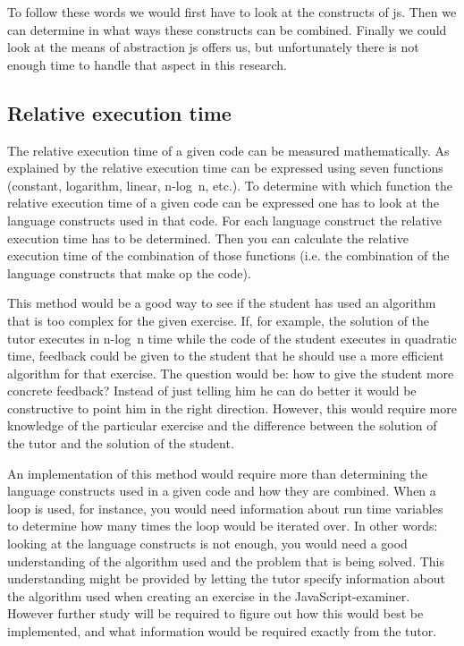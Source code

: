 To follow these words we would first have to look at
the \glspl{construct} of \gls{js}.
Then we can determine in what ways these \glspl{construct} can be combined.
Finally we could look at the means of abstraction \gls{js} offers us,
but unfortunately there is not enough time
to handle that aspect in this research.

\subsection{Relative execution time}

The relative execution time of a given code can be measured mathematically. As
explained by \citet[Chapter 4]{goodrich2008data} the relative execution time
can be expressed using seven functions (constant, logarithm, linear, n-log~n,
etc.). To determine with which function the relative execution time of a given
code can be expressed one has to look at the language constructs used in that
code. For each language construct the relative execution time has to be
determined. Then you can calculate the relative execution time of the
combination of those functions (i.e. the combination of the language constructs
that make op the code).

This method would be a good way to see if the student has used an algorithm
that is too complex for the given exercise. If, for example, the solution of
the tutor executes in n-log~n time while the code of the student executes in
quadratic time, feedback could be given to the student that he should use a
more efficient algorithm for that exercise. The question would be: how to give
the student more concrete feedback? Instead of just telling him he can do
better it would be constructive to point him in the right direction. However,
this would require more knowledge of the particular exercise and the difference
between the solution of the tutor and the solution of the student.

An implementation of this method would require more than determining the
language constructs used in a given code and how they are combined. When a loop
is used, for instance, you would need information about run time variables to
determine how many times the loop would be iterated over. In other words:
looking at the language constructs is not enough, you would need a good
understanding of the algorithm used and the problem that is being solved. This
understanding might be provided by letting the tutor specify information about
the algorithm used when creating an exercise in the
JavaScript-examiner. However further study will be required to figure out how
this would best be implemented, and what information would be required exactly
from the tutor.

